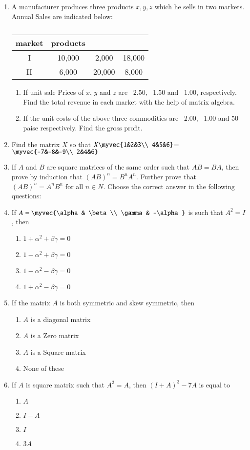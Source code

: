 \documentclass{article}
\theoremstyle{remark}
\begin{document}
\begin{enumerate}
\item A manufacturer produces three products $x, y, z$ which he sells in two markets. Annual Sales are indicated below:
\begin{table}
\centering
\begin{tabular}{|c|c c c|}
\hline
market & products\\
\hline
I &10,000 &2,000 &18,000\\
\hline
II &6,000 &20,000 &8,000\\
\hline
\end{tabular}
\caption{}
\end{table}
\begin{enumerate}
\item If unit sale Prices of $x$, $y$ and $z$ are \rupee~2.50, \rupee~1.50 and \rupee~1.00, respectively. Find the total revenue in each market with the help of matrix algebra.
\item If the unit costs of the above three commodities are \rupee~2.00, \rupee~1.00 and $50$ paise respectively. Find the gross profit.
\end{enumerate}
\item Find the matrix $X$ so that $X\myvec{1&2&3\\ 4&5&6}$= $\myvec{-7&-8&-9\\ 2&4&6}$
\item If $A$ and $B$ are square matrices of the same order such that $AB=BA$, then prove by induction that $(AB)^n=B^nA^n$. Further prove that $(AB)^n=A^nB^n$ for all $n \in N$. Choose the correct answer in the following questions:
\item If $A=\myvec{\alpha& \beta \\ \gamma& -\alpha}$ is such that $A^2= I$, then
\begin{enumerate} 
\item $1+ \alpha^2+ \beta \gamma=0$
\item $1-\alpha^2+ \beta \gamma=0$
\item $1-\alpha^2-\beta \gamma=0$
\item $1+\alpha^2- \beta \gamma=0$ 
\end{enumerate}
\item If the matrix $A$ is both symmetric and skew symmetric, then
\begin{enumerate}
\item $A$ is a diagonal matrix
\item $A$ is a Zero matrix
\item $A$ is a Square matrix
\item None of these
\end{enumerate}
\item If $A$ is square matrix such that $A^2=A$, then $(I+A)^3-7A$ is equal to
\begin{enumerate}
\item $A$
\item $I-A$
\item $I$
\item $3A$
\end{enumerate}
\end{enumerate}
\end{document}
